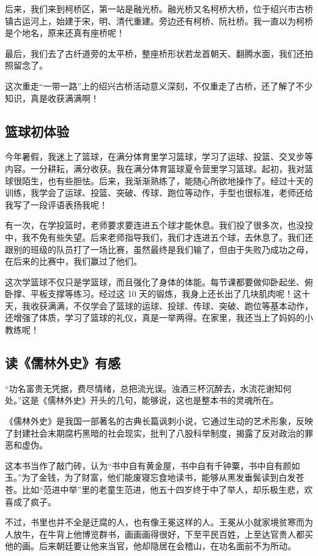 \documentclass[UTF8,a4paper,titlepage,twoside,10.5pt]{article}
\begin{document}
后来，我们来到柯桥区，第一站是融光桥。融光桥又名柯桥大桥，位于绍兴市古桥镇古运河上，始建于宋，明、清代重建。旁边还有柯桥、阮社桥。我一直以为柯桥是个地名，原来还真有座桥呢！

最后，我们去了古纤道旁的太平桥，整座桥形状若龙首朝天、翻腾水面，我们还拍照留念了。

这次重走“一带一路”上的绍兴古桥活动意义深刻，不仅重走了古桥，还了解了不少知识，真是收获满满啊！

\subsection{篮球初体验}
\label{sec:org526f5f4}

今年暑假，我迷上了篮球，在满分体育里学习篮球，学习了运球、投篮、交叉步等内容。一分耕耘，满分收获。我在满分体育篮球夏令营里学习篮球。起初，我对篮球很陌生，也有些胆怯。后来，我渐渐熟练了，能随心所欲地操作了。经过十天的训练，我学会了运球、投篮、突破、传球、跑位等动作，手型也很标准，老师还给我写了一段评语表扬我呢！

有一次，在学投篮时，老师要求要连进五个球才能休息。我们投了很多次，也没投中，我不免有些失望。后来老师指导我们，我们才连进五个球，去休息了。我们还跟别的班级的队员打了一场比赛，虽然最终是我们输了，但由于失败乃成功之母，在后来的比赛中，我们赢过了他们。

这次学篮球不仅只是学篮球，而且强化了身体的体能。每节课都要做仰卧起坐、俯卧撑、平板支撑等练习。经过这 10 天的锻炼，我身上还长出了几块肌肉呢！这十天，我收获满满，不仅学会了篮球的运球、投球、传球、突破、跑位等基本动作，还增强了体质，学习了篮球的礼仪，真是一举两得。在家里，我还当上了妈妈的小教练呢！

\subsection{读《儒林外史》有感}
\label{sec:org2bbede3}

“功名富贵无凭据，费尽情绪，总把流光误。浊酒三杯沉醉去，水流花谢知何处。”这是《儒林外史》开头的几句，能够说，这也是整本书的灵魂所在。

《儒林外史》是我国一部著名的古典长篇讽刺小说，它通过生动的艺术形象，反映了封建社会末期腐朽黑暗的社会现实，批判了八股科举制度，揭露了反对政治的罪恶和虚伪。

这本书当作了敲门砖，认为“书中自有黄金屋，书中自有千钟粟，书中自有颜如玉。”为了金钱，为了财富，他们能废寝忘食地读书，能够从黑发垂鬓读到白发苍苍。比如“范进中举”里的老童生范进，他五十四岁终于中了举人，却乐极生悲，欢喜成了疯子。

不过，书里也并不全是迂腐的人，也有像王冕这样的人。王冕从小就家境贫寒而为人放牛，在牛背上他博览群书，画画画得很好，下至平民百姓，上至达官贵人都买他的画。后来朝廷要让他来当官，他却隐居在会稽山，在功名面前不为所动。
\end{document}
